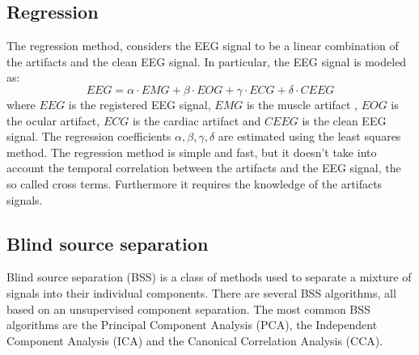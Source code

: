 \documentclass[a4paper, noexaminfo]{sapthesis}
\begin{document}
\subsection{Regression}\label{sec:regression}
The regression method\cite{regression}, considers the EEG signal to be a
linear combination of the artifacts and the clean EEG signal. In particular,
the EEG signal is modeled as:
\begin{equation}
\label{eq:regression}
EEG = \alpha \cdot EMG + \beta \cdot EOG + \gamma \cdot ECG + \delta \cdot CEEG
\end{equation}
where $EEG$ is the registered EEG signal, $EMG$ is the muscle artifact
, $EOG$ is the ocular artifact,
$ECG$ is the cardiac artifact
and $CEEG$ is the clean EEG signal. \newline
The regression coefficients $\alpha, \beta, \gamma, \delta$ are estimated
using the least squares method. \newline
The regression method is simple and fast, but it doesn't take into account
the temporal correlation between the artifacts and the EEG signal, the so 
called cross terms. Furthermore it requires the knowledge of the artifacts
signals. \newline
\subsection{Blind source separation}\label{sec:bss}
Blind source separation (BSS)\cite{bss} is a  class of methods used to separate a
mixture of signals into their individual components. 
There are several BSS algorithms, all based on an unsupervised component 
separation. 
The most common BSS algorithms are the Principal Component Analysis (PCA),
the Independent Component Analysis (ICA) and the Canonical Correlation 
Analysis (CCA).
\newline
\end{document}
